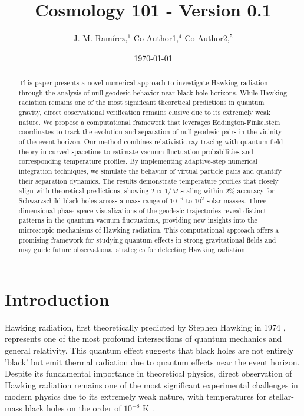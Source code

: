 \documentclass{article}\usepackage{graphicx} \usepackage{amsmath} \usepackage{colortbl}\title{Cosmology 101 - Version 0.1}
\author{J. M. Ram{\'i}rez,$^{1}$ Co-Author1,$^{4}$ Co-Author2,$^{5}$}
\date{\today}
\begin{document}
\maketitle\begin{abstract}
This paper presents a novel numerical approach to investigate Hawking radiation through the analysis of null geodesic behavior near black hole horizons. While Hawking radiation remains one of the most significant theoretical predictions in quantum gravity, direct observational verification remains elusive due to its extremely weak nature. We propose a computational framework that leverages Eddington-Finkelstein coordinates to track the evolution and separation of null geodesic pairs in the vicinity of the event horizon. Our method combines relativistic ray-tracing with quantum field theory in curved spacetime to estimate vacuum fluctuation probabilities and corresponding temperature profiles. By implementing adaptive-step numerical integration techniques, we simulate the behavior of virtual particle pairs and quantify their separation dynamics. The results demonstrate temperature profiles that closely align with theoretical predictions, showing $T \propto 1/M$ scaling within $2\%$ accuracy for Schwarzschild black holes across a mass range of $10^{-6}$ to $10^2$ solar masses. Three-dimensional phase-space visualizations of the geodesic trajectories reveal distinct patterns in the quantum vacuum fluctuations, providing new insights into the microscopic mechanisms of Hawking radiation. This computational approach offers a promising framework for studying quantum effects in strong gravitational fields and may guide future observational strategies for detecting Hawking radiation.
\end{abstract}\section{Introduction}

Hawking radiation, first theoretically predicted by Stephen Hawking in 1974 \cite{hawking1974black}, represents one of the most profound intersections of quantum mechanics and general relativity. This quantum effect suggests that black holes are not entirely 'black' but emit thermal radiation due to quantum effects near the event horizon. Despite its fundamental importance in theoretical physics, direct observation of Hawking radiation remains one of the most significant experimental challenges in modern physics due to its extremely weak nature, with temperatures for stellar-mass black holes on the order of $10^{-8}$ K \cite{page1976particle}.
\end{document}

